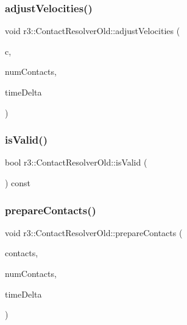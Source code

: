 \mbox{\label{classr3_1_1_contact_resolver_old_a36ab454cb770c45cba109ee8516d9711}} 
\subsubsection{\texorpdfstring{adjust\+Velocities()}{adjustVelocities()}}
{\footnotesize\ttfamily void r3\+::\+Contact\+Resolver\+Old\+::adjust\+Velocities (\begin{DoxyParamCaption}\item[{\mbox{\hyperlink{classr3_1_1_contact_old}{Contact\+Old}} $\ast$}]{c,  }\item[{unsigned}]{num\+Contacts,  }\item[{\mbox{\hyperlink{namespacer3_ab2016b3e3f743fb735afce242f0dc1eb}{real}}}]{time\+Delta }\end{DoxyParamCaption})}

\mbox{\label{classr3_1_1_contact_resolver_old_ac5642b09a3e325182c7923a352f8adb4}} 
\subsubsection{\texorpdfstring{is\+Valid()}{isValid()}}
{\footnotesize\ttfamily bool r3\+::\+Contact\+Resolver\+Old\+::is\+Valid (\begin{DoxyParamCaption}{ }\end{DoxyParamCaption}) const}

\mbox{\label{classr3_1_1_contact_resolver_old_aec82455efcca455ec890ad434bbdb900}} 
\subsubsection{\texorpdfstring{prepare\+Contacts()}{prepareContacts()}}
{\footnotesize\ttfamily void r3\+::\+Contact\+Resolver\+Old\+::prepare\+Contacts (\begin{DoxyParamCaption}\item[{\mbox{\hyperlink{classr3_1_1_contact_old}{Contact\+Old}} $\ast$}]{contacts,  }\item[{unsigned}]{num\+Contacts,  }\item[{\mbox{\hyperlink{namespacer3_ab2016b3e3f743fb735afce242f0dc1eb}{real}}}]{time\+Delta }\end{DoxyParamCaption})}

